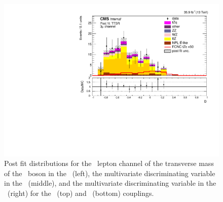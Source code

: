 \begin{figure}[htbp]
	\includegraphics[width=0.49\linewidth]{6_Search/Figures/ZctFit/shapes_fit_s_LepChan_3mu_TTSR_error_trial.pdf}
	\caption{Post fit distributions for the \mumumu\ lepton channel of the transverse mass of the \PW\ boson in the \WZCR\ (left), the multivariate discriminating variable in the \STSR\ (middle), and the multivariate discriminating variable in the \TTSR\ (right) for the \Zut\ (top) and \Zct\ (bottom) couplings. }
	\label{fig:shapesfit3mu}
\end{figure}

